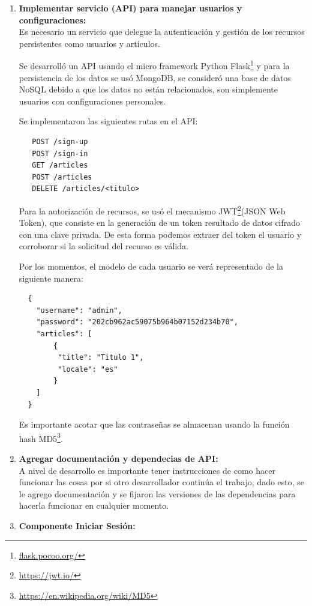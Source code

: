 \begin{enumerate}
  \item\textbf{Implementar servicio (API) para manejar usuarios y configuraciones:}\\
  
  Es necesario un servicio que delegue la autenticación y gestión de los recursos persistentes como usuarios y artículos.
  
  Se desarrolló un API usando el micro framework Python Flask\footnote{\url{flask.pocoo.org/}} y para la persistencia de los datos se usó MongoDB, se consideró una base de datos NoSQL debido a que los datos no están relacionados, son simplemente usuarios con configuraciones personales.
  
  Se implementaron las siguientes rutas en el API:
  \begin{verbatim}
   POST /sign-up
   POST /sign-in
   GET /articles
   POST /articles
   DELETE /articles/<titulo>
  \end{verbatim}
  
  Para la autorización de recursos, se usó el mecanismo JWT\footnote{\url{https://jwt.io/}}(JSON Web Token), que consiste en la generación de un token resultado de datos cifrado con una clave privada. De esta forma podemos extraer del token el usuario y corroborar si la solicitud del recurso es válida.
  
  
  Por los momentos, el modelo de cada usuario se verá representado de la siguiente manera:
  
  \begin{verbatim}
  {
    "username": "admin",
    "password": "202cb962ac59075b964b07152d234b70",
    "articles": [
        {
         "title": "Titulo 1",
         "locale": "es"
        }
    ]
  }
  \end{verbatim}
  
  Es importante acotar que las contraseñas se almacenan usando la función hash MD5\footnote{\url{https://en.wikipedia.org/wiki/MD5}}.

  \item\textbf{Agregar documentación y dependecias de API:}\\
  
  A nivel de desarrollo es importante tener instrucciones de como hacer funcionar las cosas por si otro desarrollador continúa el trabajo, dado esto, se le agrego documentación y se fijaron las versiones de las dependencias para hacerla funcionar en cualquier momento.
  
  \item\textbf{Componente Iniciar Sesión:}\\
  

\end{enumerate}
